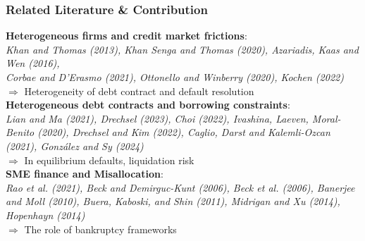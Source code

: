 \documentclass[aspectratio=169,xcolor=table]{beamer}
\begin{document}
\begin{frame}[label=lit] \frametitle{Related Literature \& \textcolor{primary}{Contribution} }

\textbf{Heterogeneous firms and credit market frictions}: \\
\footnotesize \textit{Khan and Thomas (2013), Khan Senga and Thomas (2020), Azariadis, Kaas and Wen (2016), \\ Corbae and D'Erasmo (2021), Ottonello and Winberry (2020), Kochen (2022)} \normalsize \\ 
\qquad $\Rightarrow$ \textcolor{primary}{Heterogeneity of debt contract and default resolution} \vspace{3mm} \\

\textbf{Heterogeneous debt contracts and borrowing constraints}: \\
\footnotesize \textit{Lian and Ma (2021), Drechsel (2023), Choi (2022),  Ivashina, Laeven, Moral-Benito (2020), Drechsel and Kim (2022), Caglio, Darst and Kalemli-Ozcan (2021), González and Sy (2024)} \normalsize \\ 
\qquad $\Rightarrow$ \textcolor{primary}{In equilibrium defaults, liquidation risk}\vspace{3mm} \\

\textbf{SME finance and Misallocation}: \\
\footnotesize \textit{Rao et al. (2021), Beck and Demirguc-Kunt (2006), Beck et al. (2006), Banerjee and Moll (2010), Buera, Kaboski, and Shin (2011), Midrigan and Xu (2014), Hopenhayn (2014)} \\ \normalsize 
\qquad $\Rightarrow$ \textcolor{primary}{The role of bankruptcy frameworks}

\end{frame} 
\end{document}
